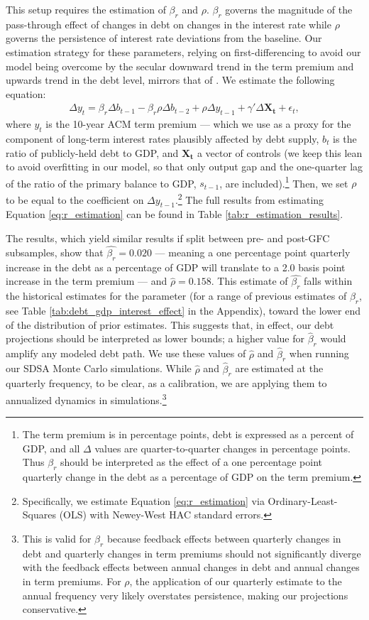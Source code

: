 \documentclass[12pt]{article}
\begin{document}
This setup requires the estimation of $\beta_r$ and $\rho$. $\beta_r$ governs the magnitude of the pass-through effect of changes in debt on changes in the interest rate while $\rho$ governs the persistence of interest rate deviations from the baseline. Our estimation strategy for these parameters, relying on first-differencing to avoid our model being overcome by the secular downward trend in the term premium and upwards trend in the debt level, mirrors that of \textcite{gust2024government}. We estimate the following equation:
\begin{gather}
    \Delta y_t = \beta_r \Delta b_{t-1} - \beta_r \rho \Delta b_{t-2} + \rho \Delta y_{t-1} + \gamma ' \Delta \mathbf{X_t} + \epsilon_t,
    \label{eq:r_estimation}
\end{gather}
where $y_t$ is the 10-year ACM term premium \parencite{adrian_2012} --- which we use as a proxy for the component of long-term interest rates plausibly affected by debt supply, $b_t$ is the ratio of publicly-held debt to GDP, and $\mathbf{X_t}$ a vector of controls (we keep this lean to avoid overfitting in our model, so that only output gap and the one-quarter lag of the ratio of the primary balance to GDP, $s_{t-1}$, are included).\footnote{The term premium is in percentage points, debt is expressed as a percent of GDP, and all $\Delta$ values are quarter-to-quarter changes in percentage points. Thus $\beta_r$ should be interpreted as the effect of a one percentage point quarterly change in the debt as a percentage of GDP on the term premium.} Then, we set $\rho$ to be equal to the coefficient on $\Delta y_{t-1}$.\footnote{Specifically, we estimate Equation \ref{eq:r_estimation} via Ordinary-Least-Squares (OLS) with Newey-West HAC standard errors.} The full results from estimating Equation \ref{eq:r_estimation} can be found in Table \ref{tab:r_estimation_results}.

The results, which yield similar results if split between pre- and post-GFC subsamples, show that $\hat{\beta_r} = 0.020$ --- meaning a one percentage point quarterly increase in the debt as a percentage of GDP will translate to a 2.0 basis point increase in the term premium --- and $\hat{\rho} = 0.158$. This estimate of $\hat{\beta_r}$ falls within the historical estimates for the parameter (for a range of previous estimates of $\beta_r$, see Table \ref{tab:debt_gdp_interest_effect} in the Appendix), toward the lower end of the distribution of prior estimates. This suggests that, in effect, our debt projections should be interpreted as lower bounds; a higher value for $\hat{\beta}_r$ would amplify any modeled debt path. We use these values of $\hat{\rho}$ and $\hat{\beta}_r$ when running our SDSA Monte Carlo simulations. While $\hat{\rho}$ and $\hat{\beta}_r$ are estimated at the quarterly frequency, to be clear, as a calibration, we are applying them to annualized dynamics in simulations.\footnote{This is valid for $\beta_r$ because feedback effects between quarterly changes in debt and quarterly changes in term premiums should not significantly diverge with the feedback effects between annual changes in debt and annual changes in term premiums. For $\rho$, the application of our quarterly estimate to the annual frequency very likely overstates persistence, making our projections conservative.}
\end{document}
